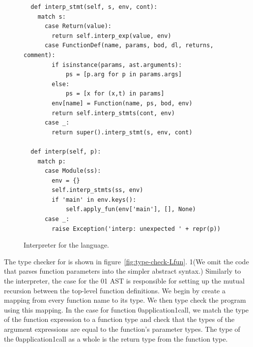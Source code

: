 \documentclass[7x10]{TimesAPriori_MIT}%
\def\racketEd{0}
\def\pythonEd{1}
\def\edition{1}
\newcommand{\racket}[1]{{\if\edition\racketEd{#1}\fi}}
\newcommand{\pythonColor}[0]{}
\newcommand{\python}[1]{{\if\edition\pythonEd\pythonColor #1\fi}}
\numberwithin{theorem}{chapter}
\numberwithin{definition}{chapter}
\numberwithin{equation}{chapter}
\begin{document}
\begin{figure}[tp]
\begin{tcolorbox}[colback=white]
{\begin{lstlisting}
  def interp_stmt(self, s, env, cont):
    match s:
      case Return(value):
        return self.interp_exp(value, env)
      case FunctionDef(name, params, bod, dl, returns, comment):
        if isinstance(params, ast.arguments):
            ps = [p.arg for p in params.args]
        else:
            ps = [x for (x,t) in params]
        env[name] = Function(name, ps, bod, env)
        return self.interp_stmts(cont, env)
      case _:
        return super().interp_stmt(s, env, cont)
    
  def interp(self, p):
    match p:
      case Module(ss):
        env = {}
        self.interp_stmts(ss, env)
        if 'main' in env.keys():
            self.apply_fun(env['main'], [], None)
      case _:
        raise Exception('interp: unexpected ' + repr(p))
\end{lstlisting}
\fi}
  \end{tcolorbox}

  \caption{Interpreter for the \LangFun{} language.}
\label{fig:interp-Lfun}
\end{figure}



The type checker for \LangFun{} is shown in
figure~\ref{fig:type-check-Lfun}.
%
\python{(We omit the code that parses function parameters into the
  simpler abstract syntax.)}
%
Similarly to the interpreter, the case for the
\racket{}\python{}
%
AST is responsible for setting up the mutual recursion between the
top-level function definitions. We begin by create a mapping
 from every function name to its type. We then type check
the program using this mapping.
%
In the case for function \racket{application}\python{call}, we match
the type of the function expression to a function type and check that
the types of the argument expressions are equal to the function's
parameter types. The type of the \racket{application}\python{call} as
a whole is the return type from the function type.
\end{document}
